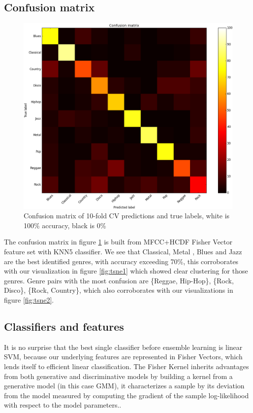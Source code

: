 \subsection{Confusion matrix}
\begin{figure}
	\includegraphics[width=\textwidth]{confusion_matrix.png}
	\caption{Confusion matrix of 10-fold CV predictions and true labels, white is 100\% accuracy, black is 0\%}
	\label{fig:confusion}
\end{figure}
The confusion matrix in figure \ref{fig:confusion} is built from MFCC+HCDF Fisher Vector feature set with KNN5 classifier. We see that Classical, Metal , Blues and Jazz are the best identified genres, with accuracy exceeding 70\%, this corroborates with our visualization in figure \ref{fig:tsne1} which showed clear clustering for those genres. Genre pairs with the most confusion are \{Reggae, Hip-Hop\}, \{Rock, Disco\}, \{Rock, Country\}, which also corroborates with our visualizations in figure \ref{fig:tsne2}. 
\subsection{Classifiers and features}
It is no surprise that the best single classifier before ensemble learning is linear SVM, because our underlying features are represented in Fisher Vectors, which lends itself to efficient linear classification.
The Fisher Kernel inherits advantages from both generative and discriminative models by building a kernel from a generative model (in this case GMM),  it characterizes a sample by its deviation from the model measured by computing the gradient of the sample log-likelihood with  respect  to  the  model  parameters.\cite{HAL}.

